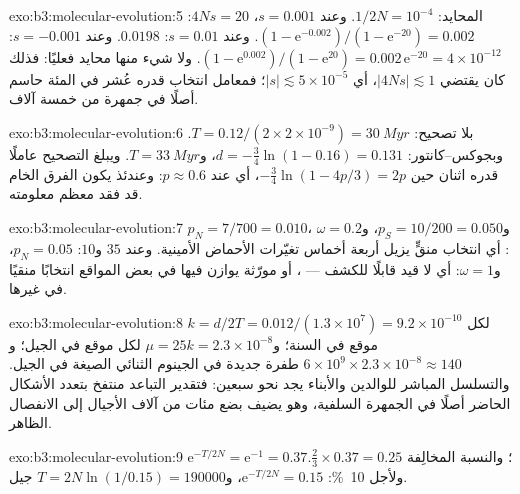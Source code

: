 \begin{solution}{exo:b3:molecular-evolution:5}
المحايد: $1/2N = 10^{-4}$. وعند $s = 0.001$، $4Ns = 20$: $(1 - \mathrm{e}^{-0.002})/
(1 - \mathrm{e}^{-20}) = 0.002$. وعند $s = 0.01$: $0.0198$. وعند $s = -0.001$: $(1 -
\mathrm{e}^{0.002})/(1 - \mathrm{e}^{20}) = 0.002\,\mathrm{e}^{-20} =
4\times 10^{-12}$. ولا شيء منها محايد فعليًا: فذلك كان يقتضي $|4Ns|
\lesssim 1$، أي $|s| \lesssim 5\times 10^{-5}$؛ فمعامل انتخاب
قدره عُشر في المئة حاسم أصلًا في جمهرة
من خمسة آلاف.
\end{solution}

\begin{solution}{exo:b3:molecular-evolution:6}
بلا تصحيح: $T = 0.12/(2\times 2\times 10^{-9}) = \qty{30}{Myr}$.
وبجوكس--كانتور: $d = -\tfrac{3}{4}\ln(1 - 0.16) = 0.131$، و$T =
\qty{33}{Myr}$. ويبلغ التصحيح عاملًا قدره اثنان حين $-\tfrac{3}{4}
\ln(1 - 4p/3) = 2p$، أي عند $p \approx 0.6$: وعندئذ يكون الفرق الخام قد
فقد معظم معلومته.
\end{solution}

\begin{solution}{exo:b3:molecular-evolution:7}
$p_{N} = 7/700 = 0.010$، و$p_{S} = 10/200 = 0.050$، و$\omega = 0.2$:
أي انتخاب منقٍّ يزيل أربعة أخماس تغيّرات الأحماض الأمينية. وعند
$35$ و$10$: $p_{N} = 0.05$، و$\omega = 1$: أي لا قيد قابلًا للكشف ---
، أو مورّثة يوازن فيها  في بعض
المواقع انتخابًا منقيًا في غيرها.
\end{solution}

\begin{solution}{exo:b3:molecular-evolution:8}
$k = d/2T = 0.012/(1.3\times 10^{7}) = 9.2\times 10^{-10}$ لكل موقع في
السنة؛ و$\mu = 25k = 2.3\times 10^{-8}$ لكل موقع في الجيل؛ و$6\times
10^{9}\times 2.3\times 10^{-8} \approx 140$ طفرة جديدة في الجينوم
الثنائي الصيغة في الجيل. والتسلسل المباشر للوالدين والأبناء يجد
نحو سبعين: فتقدير التباعد منتفخ بتعدد الأشكال الحاضر أصلًا
في الجمهرة السلفية، وهو يضيف بضع مئات
من آلاف الأجيال إلى الانفصال الظاهر.
\end{solution}

\begin{solution}{exo:b3:molecular-evolution:9}
$\mathrm{e}^{-T/2N} = \mathrm{e}^{-1} = 0.37$؛ والنسبة المخالِفة $\tfrac{2}{3}
\times 0.37 = 0.25$. ولأجل \qty{10}{\%}: $\mathrm{e}^{-T/2N} = 0.15$، و$T =
2N\ln(1/0.15) = \num{190000}$ جيل.
\end{solution}

